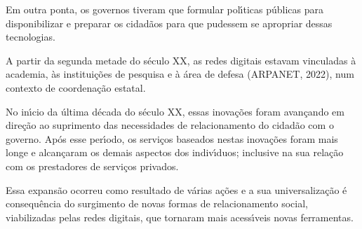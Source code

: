 \documentclass[
12pt,		%
openright,	%
twoside,  %
a4paper,			%
chapter=TITLE,		%
english,			%
french,				%
spanish,			%
brazil				%
]{USPSC-classe/USPSC}
\begin{document}
Em outra ponta, os governos tiveram que formular pol\'{\i}ticas p\'ublicas para disponibilizar e preparar os cidad\~aos para que pudessem se apropriar dessas tecnologias.

















A partir da segunda metade do s\'eculo XX, as redes digitais estavam vinculadas \`a academia, \`as institui\c{c}\~oes de pesquisa e \`a \'area de defesa  (ARPANET, 2022), num contexto de coordena\c{c}\~ao estatal.

















No in\'{\i}cio da \'ultima d\'ecada do s\'eculo XX, essas inova\c{c}\~oes  foram avan\c{c}ando em dire\c{c}\~ao ao suprimento das necessidades de relacionamento do cidad\~ao com o governo. Ap\'os esse per\'{\i}odo, os servi\c{c}os baseados nestas inova\c{c}\~oes foram mais longe e alcan\c{c}aram  os demais aspectos dos indiv\'{\i}duos; inclusive na sua rela\c{c}\~ao com os prestadores de servi\c{c}os privados.

















Essa expans\~ao ocorreu como resultado de v\'arias a\c{c}\~oes e a sua universaliza\c{c}\~ao \'e consequ\^encia do surgimento de novas formas de relacionamento social, viabilizadas pelas redes digitais, que tornaram mais acess\'{\i}veis novas ferramentas.
\end{document}
